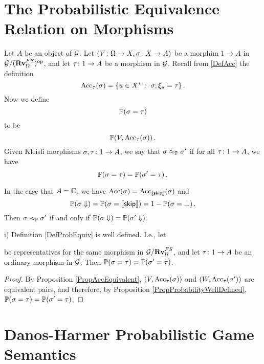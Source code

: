 \documentclass{report}[11pt]
\begin{document}
\section{The Probabilistic Equivalence Relation on Morphisms}

\begin{definition}
  Let $A$ be an object of $\mathcal G$.  
  Let $(V\colon\Omega \to X,\sigma\colon X \to A)$ be a morphim $1\to A$ in $\mathcal G/({\normalfont\textbf{Rv}}_{\Omega}^{FS})^{\mathrm{op}}$, and let $\tau \colon 1 \to A$ be a morphism in $\mathcal G$.  
  Recall from \ref{DefAcc} the definition
  \[
    \operatorname{Acc}_\tau(\sigma) = \{u\in X^* \;\colon\; \sigma;\xi_u = \tau\}\,.
    \]
  Now we define
  \[
    \mathbb{P}(\sigma = \tau)
    \]
  to be
  \[
    \mathbb{P}(V,\operatorname{Acc}_\tau(\sigma))\,.
    \]
  Given Kleisli morphisms $\sigma,\tau\colon 1 \to A$, we say that $\sigma\approx_{\mathbb{P}}\sigma'$ if for all $\tau\colon 1 \to A$, we have
  \[
    \mathbb{P}(\sigma = \tau) = \mathbb{P}(\sigma' = \tau)\,.
    \]
  \label{DefProbEquiv}
\end{definition}
\begin{remark}
  In the case that $A=\mathbb{C}$, we have $\operatorname{Acc}(\sigma) = \operatorname{Acc}_{\left\llbracket{\mathsf{skip}}\right\rrbracket}(\sigma)$ and
  \[
    \mathbb{P}(\sigma\Downarrow) = \mathbb{P}(\sigma = \left\llbracket{\mathsf{skip}}\right\rrbracket) = 1 - \mathbb{P}(\sigma = \bot)\,.
    \]
  Then $\sigma\approx_{\mathbb{P}}\sigma'$ if and only if $\mathbb{P}(\sigma\Downarrow)=\mathbb{P}(\sigma'\Downarrow)$.
\end{remark}

\begin{proposition}
  i) Definition \ref{DefProbEquiv} is well defined.  
  I.e., let
  be representatives for the same morphism in $\mathcal G/{\normalfont\textbf{Rv}}_{\Omega}^{FS}$, and let $\tau \colon 1 \to A$ be an ordinary morphism in $\mathcal G$.  
  Then $\mathbb{P}(\sigma = \tau) = \mathbb{P}(\sigma' = \tau)$.  
\end{proposition}
\begin{proof}
  By Proposition \ref{PropAccEquivalent}, $(V,\operatorname{Acc}_\tau(\sigma))$ and $(W,\operatorname{Acc}_\tau(\sigma'))$ are equivalent pairs, and therefore, by Proposition \ref{PropProbabilityWellDefined}, $\mathbb{P}(\sigma = \tau) = \mathbb{P}(\sigma' = \tau)$.
\end{proof}

\section{Danos-Harmer Probabilistic Game Semantics}
\end{document}
